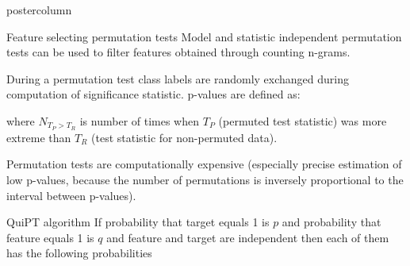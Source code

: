 \documentclass[final]{beamer}\usepackage[]{graphicx}\usepackage[]{color}
\begin{document}
\begin{frame}
\begin{columns}
\begin{column}{.49\textwidth}
\begin{beamercolorbox}[center,wd=\textwidth]{postercolumn}
\begin{minipage}[T]{.95\textwidth}
{    
    \begin{block}{Feature selecting permutation tests}
    Model and statistic independent permutation tests can be used to filter features obtained through counting n-grams.
    
    During a permutation test class labels are randomly exchanged during computation of significance statistic. p-values are defined as:
    
\begin{center}
\end{center}

where $N_{T_P > T_R}$ is number of times when $T_P$ (permuted test statistic) was more extreme than $T_R$ (test statistic for non-permuted data).

Permutation tests are computationally expensive (especially precise estimation of low p-values, because the number of permutations is inversely proportional to the interval between p-values).
      
    \end{block}
    \vfill
    
    
    \begin{block}{QuiPT algorithm}
      If probability that target equals 1 is $p$ and probability that feature equals
1 is $q$ and feature and target are independent then each of them has the 
following probabilities 

\begin{center}
\scalebox{0.85}{
$P(Target, Feature) = (1,1)) = p \cdot q$
}
\end{center}

\\

\begin{center}
\scalebox{0.85}{
$P(Target, Feature) = (1,0)) = p \cdot (1-q)$
}
\end{center}

\\

\begin{center}
\scalebox{0.85}{
$P(Target, Feature) = (0,1)) = (1-p) \cdot q$
}
\end{center}

\\

\begin{center}
\scalebox{0.85}{
$P(Target, Feature) = (0,0)) = (1-p) \cdot (1-q)$
}
\end{center}


\end{block}}
\end{minipage}
\end{beamercolorbox}
\end{column}
\end{columns}
\end{frame}
\end{document}
